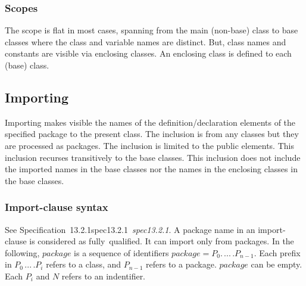 \documentclass[10pt,b5paper]{article}
\def\specrefx#1#2{Specification~#1\ifx\relax#2\relax{}\else~{\it{}#2}\fi}
\def\specref#1{\specrefx{#1}{\csname spec#1\endcsname}}
\begin{document}
\fi

\subsubsection*{Scopes}

The scope is flat in most cases, spanning from the main (non-base)
class to base classes where the class and variable names are distinct.
But, class names and constants are visible via enclosing classes.  An
enclosing class is defined to each (base) class.


\subsection{Importing}

\def\baseofbase{This inclusion recurses transitively to the base
classes}

\def\noimport{This inclusion does not include the imported names in
the base classes nor the names in the enclosing classes in the base
classes}

Importing makes visible the names of the definition/declaration
elements of the specified package to the present class.  The inclusion
is from any classes but they are processed as packages.  The inclusion
is limited to the public elements. \baseofbase. \noimport.

\subsubsection*{Import-clause syntax}

\def\packagenames{P_0.\,...\,.P_{n-1}}

See \specref{13.2.1}.  A package name in an import-clause is
considered as fully~qualified.  It can import only from packages.  In
the following, $\mathit{package}$ is a sequence of identifiers
$\mathit{package}=\packagenames$.  Each prefix in $P_0\,...\,.P_i$
refers to a class, and $P_{n-1}$ refers to a package.
$\mathit{package}$ can be empty.  Each $P_i$ and $N$ refers to an
indentifier.
\end{document}
